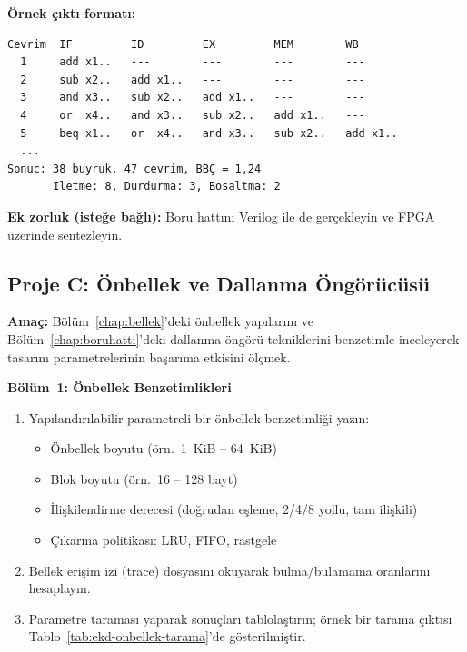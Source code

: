 \textbf{Örnek çıktı formatı:}
\begin{lstlisting}[numbers=none, basicstyle=\ttfamily\footnotesize]
Cevrim  IF         ID         EX         MEM        WB
  1     add x1..   ---        ---        ---        ---
  2     sub x2..   add x1..   ---        ---        ---
  3     and x3..   sub x2..   add x1..   ---        ---
  4     or  x4..   and x3..   sub x2..   add x1..   ---
  5     beq x1..   or  x4..   and x3..   sub x2..   add x1..
  ...
Sonuc: 38 buyruk, 47 cevrim, BBÇ = 1,24
       Iletme: 8, Durdurma: 3, Bosaltma: 2
\end{lstlisting}

\textbf{Ek zorluk (isteğe bağlı):} Boru hattını Verilog ile de gerçekleyin ve FPGA üzerinde sentezleyin.


\subsection{Proje C: Önbellek ve Dallanma Öngörücüsü}
\label{sec:ekd-proje-c}

\textbf{Amaç:} Bölüm~\ref{chap:bellek}'deki önbellek yapılarını ve Bölüm~\ref{chap:boruhatti}'deki dallanma öngörü tekniklerini benzetimle inceleyerek tasarım parametrelerinin başarıma etkisini ölçmek.\smallskip

\textbf{Bölüm~1: Önbellek Benzetimlikleri}
\begin{enumerate}[leftmargin=2em]
    \item Yapılandırılabilir parametreli bir önbellek benzetimliği yazın:
    \begin{itemize}[leftmargin=1.5em]
        \item Önbellek boyutu (örn.\ 1~KiB -- 64~KiB)
        \item Blok boyutu (örn.\ 16 -- 128 bayt)
        \item İlişkilendirme derecesi (doğrudan eşleme, 2/4/8 yollu, tam ilişkili)
        \item Çıkarma politikası: LRU, FIFO, rastgele
    \end{itemize}
    \item Bellek erişim izi (trace) dosyasını okuyarak bulma/bulamama oranlarını hesaplayın.
    \item Parametre taraması yaparak sonuçları tablolaştırın; örnek bir tarama çıktısı Tablo~\ref{tab:ekd-onbellek-tarama}'de gösterilmiştir.
\end{enumerate}

